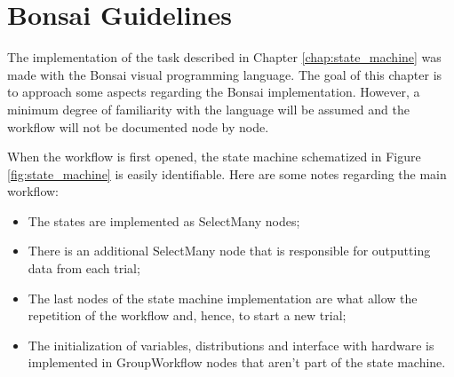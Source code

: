 \chapter{Bonsai Guidelines}
\label{chap:bonsai}
The implementation of the task described in Chapter \ref{chap:state_machine} was made with the Bonsai visual programming language. The goal of this chapter is to approach some aspects regarding the Bonsai implementation. However, a minimum degree of familiarity with the language will be assumed and the workflow will not be documented node by node.

When the workflow is first opened, the state machine schematized in Figure \ref{fig:state_machine} is easily identifiable. Here are some notes regarding the main workflow:
\begin{itemize}
    \item The states are implemented as SelectMany nodes;
    \item There is an additional SelectMany node that is responsible for outputting data from each trial;
    \item The last nodes of the state machine implementation are what allow the repetition of the workflow and, hence, to start a new trial;
    \item The initialization of variables, distributions and interface with hardware is implemented in GroupWorkflow nodes that aren't part of the state machine.
\end{itemize}

